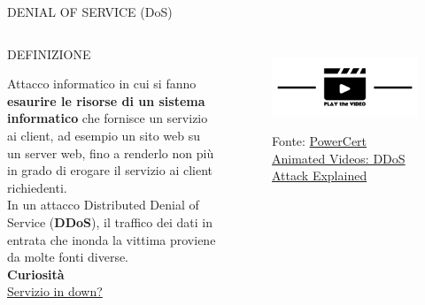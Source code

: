\documentclass[aspectratio=1610]{beamer}
\begin{document}
\begin{frame}{DENIAL OF SERVICE (DoS)}
    \begin{columns}
            \begin{alertblock}{DEFINIZIONE}
                \begin{minipage}{0.96\linewidth}
                    \justifying
                    Attacco informatico in cui si fanno \textbf{esaurire le risorse di un sistema informatico} 
                    che fornisce un servizio ai client, ad esempio un sito web su un server web, 
                    fino a renderlo non più in grado di erogare il servizio ai client richiedenti.\\
                    In un attacco Distributed Denial of Service (\textbf{DDoS}), il traffico dei dati in entrata 
                    che inonda la vittima proviene da molte fonti diverse.\\
                    \bigskip
                    \tiny{\textbf{Curiosità}}\\
                    \tiny{\href{https://downdetector.it/}{Servizio in down?}}
                \end{minipage}
            \end{alertblock}
            \begin{figure}
                \href{https://www.youtube.com/watch?v=ilhGh9CEIwM}{\includegraphics[width=\linewidth]{img/play.png}}
                \caption{{Fonte: \href{https://www.youtube.com/watch?v=ilhGh9CEIwM}{PowerCert Animated Videos: DDoS Attack Explained}}}
            \end{figure}
    \end{columns}
\end{frame}
\end{document}
